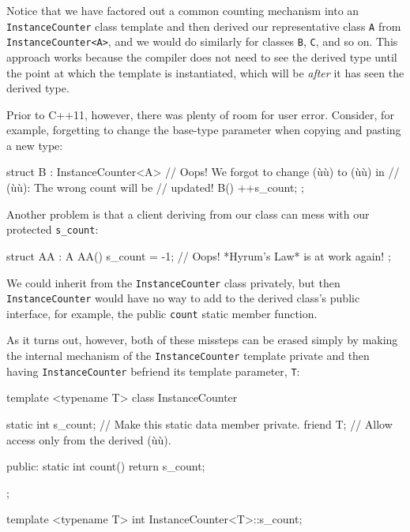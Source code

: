 \noindent Notice that we have factored out a common counting mechanism into an
\lstinline!InstanceCounter! class template and then derived our
representative class \lstinline!A! from \lstinline!InstanceCounter<A>!, and we
would do similarly for classes \lstinline!B!, \lstinline!C!, and so on. This
approach works because the compiler does not need to see the derived
type until the point at which the template is instantiated, which will
be \emph{after} it has seen the derived type.

Prior to C++11, however, there was plenty of room for user error.
Consider, for example, forgetting to change the base-type parameter when
copying and pasting a new type:

\begin{emcppslisting}[emcppsbatch=e4]
struct B : InstanceCounter<A>  // Oops! We forgot to change (ù{}ù) to (ù{}ù) in
                               // (ù{}ù): The wrong count will be
                               // updated!
{
    B() { ++s_count; }
};
\end{emcppslisting}
    
\noindent Another problem is that a client deriving from our class can mess with
our protected \lstinline!s_count!:

\begin{emcppslisting}[emcppsbatch=e4]
struct AA : A
{
    AA() { s_count = -1; }  // Oops! *Hyrum's Law* is at work again!
};
\end{emcppslisting}
    
\noindent We could inherit from the \lstinline!InstanceCounter! class privately, but
then \lstinline!InstanceCounter! would have no way to add to the derived
class's public interface, for example, the public \lstinline!count! static
member function.

As it turns out, however, both of these missteps can be erased simply by
making the internal mechanism of the \lstinline!InstanceCounter! template
private and then having \mbox{\lstinline!InstanceCounter!} befriend its template
parameter, \lstinline!T!:

\begin{emcppslisting}
template <typename T>
class InstanceCounter
{
    static int s_count;  // Make this static data member private.
    friend T;            // Allow access only from the derived (ù{}ù).

public:
    static int count() { return s_count; }
};

template <typename T>
int InstanceCounter<T>::s_count;
\end{emcppslisting}
    
